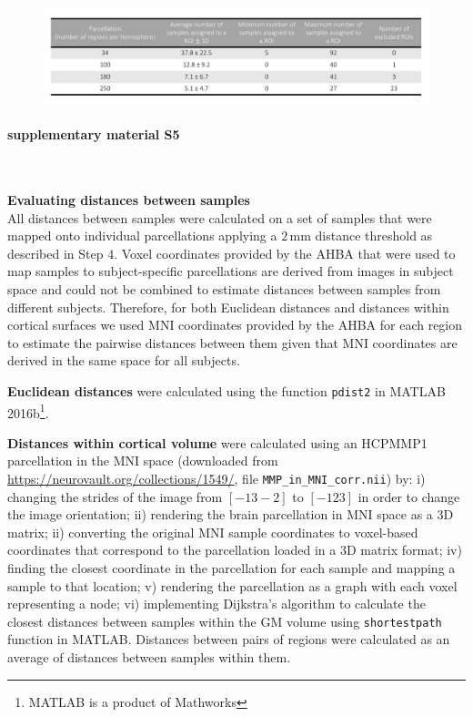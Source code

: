 \documentclass[10pt,A4]{article}
\begin{document}
\begin{figure}[h!]
  \centering
    \includegraphics[width=1\textwidth]{TableS4.pdf}
\label{TableS4}
\end{figure}

\paragraph*{supplementary material S5}\mbox{}\\
\label{SItext5}

\textbf{Evaluating distances between samples}\\
All distances between samples were calculated on a set of samples that were mapped onto individual parcellations applying a $2\,$mm distance threshold as described in Step $4$. Voxel coordinates provided by the AHBA that were used to map samples to subject-specific parcellations are derived from images in subject space and could not be combined to estimate distances between samples from different subjects. Therefore, for both Euclidean distances and distances within cortical surfaces we used MNI coordinates provided by the AHBA for each region to estimate the pairwise distances between them given that MNI coordinates are derived in the same space for all subjects.

\textbf{Euclidean distances} were calculated using the function \texttt{pdist2} in MATLAB 2016b\footnote{MATLAB is a product of Mathworks}.

\textbf{Distances within cortical volume} were calculated using an HCPMMP1 \citep{Glasser2016} parcellation in the MNI space (downloaded from \url{https://neurovault.org/collections/1549/}, file \texttt{MMP\_in\_MNI\_corr.nii})  by: i) changing the strides of the image from $[-1 3 -2]$ to $[-1 2 3]$ in order to change the image orientation; ii) rendering the brain parcellation in MNI space as a 3D matrix; ii) converting the original MNI sample coordinates to voxel-based coordinates that correspond to the parcellation loaded in a 3D matrix format; iv) finding the closest coordinate in the parcellation for each sample and mapping a sample to that location; v) rendering the parcellation as a graph with each voxel representing a node; vi) implementing Dijkstra’s algorithm \citep{Dijkstra1959} to calculate the closest distances between samples within the GM volume using \texttt{shortestpath} function in MATLAB. Distances between pairs of regions were calculated as an average of distances between samples within them. 
\end{document}
